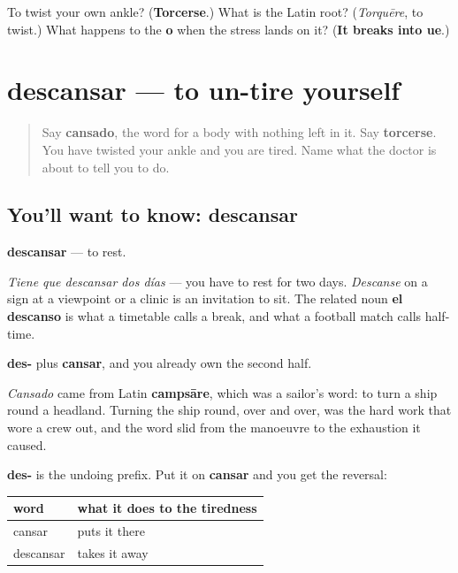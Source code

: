 \begin{tcolorbox}[breakable,colback=teal!4,colframe=teal!35!black,title={Before you move on}]
To twist your own ankle? (\textbf{Torcerse}.) What is the Latin root? (\emph{Torquēre}, to twist.) What happens to the \textbf{o} when the stress lands on it? (\textbf{It breaks into ue}.)
\end{tcolorbox}
\section[descansar]{descansar — to un-tire yourself}

\label{lesson:ES-C438-descansar}



\begin{quote}
Say \textbf{cansado}, the word for a body with nothing left in it. Say \textbf{torcerse}. You have twisted your ankle and you are tired. Name what the doctor is about to tell you to do.
\end{quote}

\subsection*{You'll want to know: descansar}
\textbf{descansar} — to rest.

\emph{Tiene que descansar dos días} — you have to rest for two days. \emph{Descanse} on a sign at a viewpoint or a clinic is an invitation to sit. The related noun \textbf{el descanso} is what a timetable calls a break, and what a football match calls half-time.

\begin{cousinweb}
\textbf{des-} plus \textbf{cansar}, and you already own the second half.

\emph{Cansado} came from Latin \textbf{campsāre}, which was a sailor's word: to turn a ship round a headland. Turning the ship round, over and over, was the hard work that wore a crew out, and the word slid from the manoeuvre to the exhaustion it caused.

\textbf{des-} is the undoing prefix. Put it on \textbf{cansar} and you get the reversal:

\noindent
\begin{tabularx}{\linewidth}{@{}>{\raggedright\arraybackslash}X>{\raggedright\arraybackslash}X@{}}
\toprule
\textbf{word} & \textbf{what it does to the tiredness} \\
\midrule
cansar & puts it there \\
descansar & takes it away \\
\bottomrule
\end{tabularx}
\end{cousinweb}

